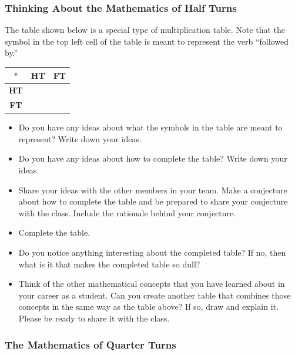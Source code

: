 \documentclass[11pt]{article}
\newenvironment{task}
	{\begin{mdframed}[linecolor=lightgray, linewidth=3pt]\raggedright}
	{\end{mdframed}}
\theoremstyle{definition}
\begin{document}
\subsubsection{Thinking About the Mathematics of Half Turns}

The table shown below is a special type of multiplication table. Note that the symbol in the top left cell of the table is meant to represent the verb ``followed by.''
\begin{center}
  \begin{tabular}{|c|c|c|}\hline
    $\ast$      & \textbf{HT} & \textbf{FT} \\ \hline
    \textbf{HT} &             & \\ \hline
    \textbf{FT} &             & \\  \hline
  \end{tabular}
\end{center}
\begin{task}
\begin{itemize}
  \item Do you have any ideas about what the symbols in the table are meant to represent? Write down your ideas.
  \item Do you have any ideas about how to complete the table? Write down your ideas.
  \item Share your ideas with the other members in your team. Make a conjecture about how to complete the table and be prepared to share your conjecture with the class. Include the rationale behind your conjecture.
  \item Complete the table.
  \item Do you notice anything interesting about the completed table? If no, then what is it that makes the completed table so dull?
  \item Think of the other mathematical concepts that you have learned about in your career as a student. Can you create another table that combines those concepts in the 
    same way as the table above? If so, draw and explain it. Please be ready to share it with the class.
\end{itemize}
\end{task}

\subsubsection{The Mathematics of Quarter Turns}
\end{document}

